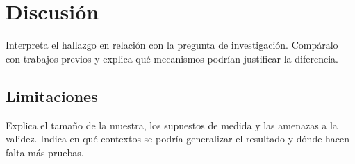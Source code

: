 \section{Discusión}
Interpreta el hallazgo en relación con la pregunta de investigación. Compáralo
con trabajos previos y explica qué mecanismos podrían justificar la diferencia.
\subsection{Limitaciones}
Explica el tamaño de la muestra, los supuestos de medida y las amenazas a la
validez. Indica en qué contextos se podría generalizar el resultado y dónde
hacen falta más pruebas.
